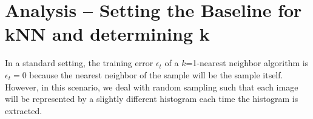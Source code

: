 \section{Analysis -- Setting the Baseline for kNN and determining k}
\label{sec:numtextons}

In a standard setting, the training error $\epsilon_t$ of a
$k$=1-nearest neighbor algorithm is $\epsilon_t = 0$ because the
nearest neighbor of the sample will be the sample itself. However, in
this scenario, we deal with random sampling such that each image will
be represented by a slightly different histogram each time the
histogram is extracted.